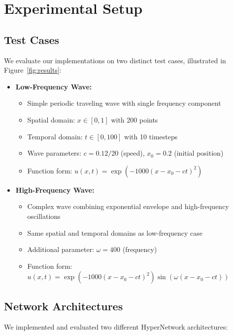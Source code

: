 \documentclass[10pt,journal,compsoc,onecolumn]{IEEEtran}
\begin{document}
\section{Experimental Setup}\label{sec:discussion}
\subsection{Test Cases}
We evaluate our implementations on two distinct test cases, illustrated in Figure~\ref{fig:results}:

\begin{itemize}
    \item \textbf{Low-Frequency Wave:}
    \begin{itemize}
        \item Simple periodic traveling wave with single frequency component
        \item Spatial domain: $x \in [0,1]$ with 200 points
        \item Temporal domain: $t \in [0,100]$ with 10 timesteps
        \item Wave parameters: $c = 0.12/20$ (speed), $x_0 = 0.2$ (initial position)
        \item Function form: $u(x,t) = \exp(-1000(x-x_0-ct)^2)$
    \end{itemize}

    \item \textbf{High-Frequency Wave:}
    \begin{itemize}
        \item Complex wave combining exponential envelope and high-frequency oscillations
        \item Same spatial and temporal domains as low-frequency case
        \item Additional parameter: $\omega = 400$ (frequency)
        \item Function form: $u(x,t) = \exp(-1000(x-x_0-ct)^2)\sin(\omega(x-x_0-ct))$
    \end{itemize}
\end{itemize}

\subsection{Network Architectures}
We implemented and evaluated two different HyperNetwork architectures:
\end{document}
